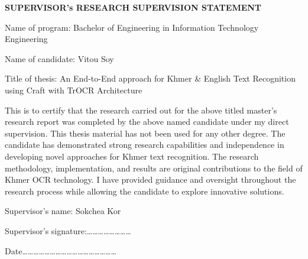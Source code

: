 \begin{adjustwidth}{0.2cm}{0.2cm}


    \begin{center}
        {\englishfont\fontsize{14pt}{21pt}\selectfont \textbf{SUPERVISOR's RESEARCH SUPERVISION STATEMENT} \par}
    \end{center}
    \label{supervisor-statement}

    \vspace{1cm}
    
    \englishfont\large
    \begin{flushleft}
    Name of program: Bachelor of Engineering in Information Technology Engineering\par
    Name of candidate: Vitou Soy\par
    \end{flushleft}

    \vspace{1cm}
    
    \englishfont\large
    \begin{flushleft}
    Title of thesis: An End-to-End approach for Khmer \& English Text Recognition using Craft with TrOCR Architecture\par
    \end{flushleft}

    \vspace{1cm}
    \setlength{\parindent}{0pt}
    This is to certify that the research carried out for the above titled master's
    research report was completed by the above named candidate under my direct
    supervision. This thesis material has not been used for any other degree. The
    candidate has demonstrated strong research capabilities and independence in
    developing novel approaches for Khmer text recognition. The research
    methodology, implementation, and results are original contributions to the field
    of Khmer OCR technology. I have provided guidance and oversight throughout
    the research process while allowing the candidate to explore innovative
    solutions.\par

    \vspace{1cm}
    \begin{flushleft}
    Supervisor's name: Sokchea Kor\par
    \vspace{0.1cm}
    Supervisor's signature:……………………\par
    \vspace{0.1cm}
    Date……………………………………………\par
    \end{flushleft}

\end{adjustwidth}